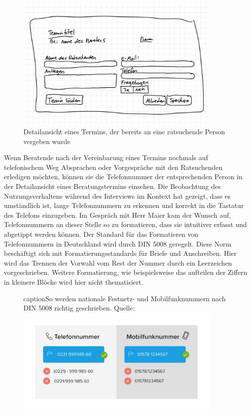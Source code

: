 \documentclass[12pt]{article}
\newcommand{\ipName}{Herr Maier }
\begin{document}
\begin{figure}[h]
    \caption{Detailansicht eines Termins, der bereits an eine ratsuchende Person vergeben wurde}
    \centering
    \includegraphics[width=0.9\textwidth]{doodle_client_details.jpeg}
\end{figure}

Wenn Beratende nach der Vereinbarung eines Termins nochmals auf telefonischem
Weg Absprachen oder Vorgespräche mit den Ratsuchenden erledigen möchten, können
sie die Telefonnummer der entsprechenden Person in der Detailansicht eines
Beratungstermins einsehen. Die Beobachtung des Nutzungsverhaltens während des
Interviews im Kontext hat gezeigt, dass es umständlich ist, lange
Telefonnummern zu erkennen und korrekt in die Tastatur des Telefons einzugeben.
Im Gespräch mit \ipName kam der Wunsch auf, Telefonnummern an dieser Stelle so
zu formatieren, dass sie intuitiver erfasst und abgetippt werden können. Der
Standard für das Formatieren von Telefonnummern in Deutschland wird durch DIN
5008 geregelt. Diese Norm beschäftigt sich mit Formatierungsstandards für
Briefe und Anschreiben. Hier wird das Trennen der Vorwahl vom Rest der Nummer
durch ein Leerzeichen vorgeschrieben. Weitere Formatierung, wie beispielsweise
das aufteilen der Ziffern in kleinere Blöcke wird hier nicht thematisiert.
\cite{din5008}

\begin{figure}[h]
    caption{So werden nationale Festnetz- und Mobilfunknummern nach DIN 5008 richtig geschrieben. Quelle: \cite{phoneFormatBlog}}
    \centering
    \includegraphics[width=0.9\textwidth]{grafik-telefonnummer-national.png}
\end{figure}
\end{document}
